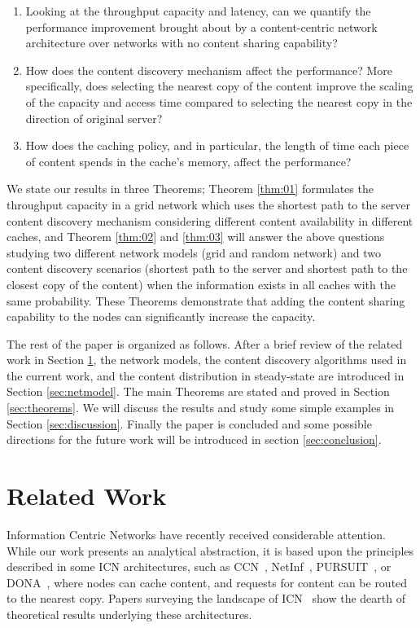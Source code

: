 \documentclass[journal]{IEEEtran}
\theoremstyle{plain}
\theoremstyle{remark}
\begin{document}
\begin{enumerate}
	\item Looking at the throughput capacity and latency, can we quantify the performance improvement brought about by a  content-centric network architecture over networks with no content sharing capability?
	\item How does the content discovery mechanism affect the performance? More specifically, does selecting the nearest copy of the content improve the scaling of the capacity and access time compared to selecting the nearest copy in the direction of original server?  
	\item How does the caching policy, and in particular, the length of time each piece of content spends in the cache's memory, affect the performance?
\end{enumerate}

We state our results in three Theorems; Theorem \ref{thm:01} formulates the throughput capacity in a grid network which uses the shortest path to the server content discovery mechanism considering different content availability in different caches, and Theorem \ref{thm:02} and \ref{thm:03} will answer the above questions studying two different network models (grid and random network) and two content discovery scenarios (shortest path to the server and shortest path to the closest copy of the content) when the information exists in all caches with the same probability. These Theorems demonstrate that adding the content sharing capability to the nodes can significantly increase the capacity.

The rest of the paper is organized as follows. After a brief review of the related work in Section \ref{sec:related}, the network models, the content discovery algorithms used in the current work, and the content distribution in steady-state are introduced in Section \ref{sec:netmodel}. The main Theorems are stated and proved in Section \ref{sec:theorems}. We will discuss the results and study some simple examples in Section \ref{sec:discussion}. Finally the paper is concluded and some possible directions for the future work will be introduced in section \ref{sec:conclusion}.

\section{Related Work}
\label{sec:related}

Information Centric Networks have recently received considerable attention. While our work presents an analytical abstraction, it is based upon the principles described in some ICN architectures, such as CCN~\cite{Jacobson2009Networking}, NetInf~\cite{Ahlgren2008Design}, PURSUIT~\cite{Pursuit}, or DONA~\cite{Koponen2007Dataoriented}, where nodes can cache content, and requests for content can be routed to the nearest copy. Papers surveying the landscape of ICN~\cite{Ahlgren2012Survey}\cite{Ghodsi2011InformationCentric} show the dearth of theoretical results underlying these architectures. 
\end{document}
